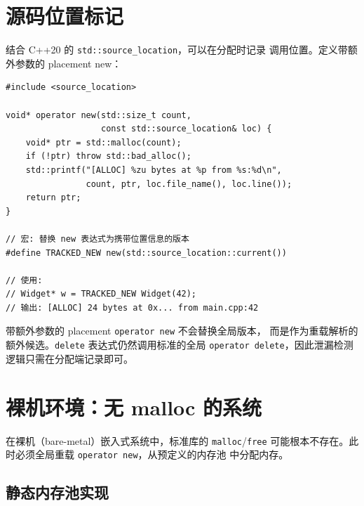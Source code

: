 \documentclass[12pt,a4paper,fontset=fandol]{ctexbook}
\newcommand{\cpp}[1]{C++#1}
\begin{document}
\section{源码位置标记}

结合 \cpp{20} 的 \texttt{std::source\_location}，可以在分配时记录
调用位置。定义带额外参数的 placement new：

\begin{lstlisting}
#include <source_location>

void* operator new(std::size_t count,
                   const std::source_location& loc) {
    void* ptr = std::malloc(count);
    if (!ptr) throw std::bad_alloc();
    std::printf("[ALLOC] %zu bytes at %p from %s:%d\n",
                count, ptr, loc.file_name(), loc.line());
    return ptr;
}

// 宏: 替换 new 表达式为携带位置信息的版本
#define TRACKED_NEW new(std::source_location::current())

// 使用:
// Widget* w = TRACKED_NEW Widget(42);
// 输出: [ALLOC] 24 bytes at 0x... from main.cpp:42
\end{lstlisting}

\begin{note}[title=Placement delete]
带额外参数的 placement \texttt{operator new} 不会替换全局版本，
而是作为重载解析的额外候选。\texttt{delete} 表达式仍然调用标准的全局
\texttt{operator delete}，因此泄漏检测逻辑只需在分配端记录即可。
\end{note}

\section{裸机环境：无 malloc 的系统}

在裸机（bare-metal）嵌入式系统中，标准库的 \texttt{malloc}/\allowbreak{}\texttt{free}
可能根本不存在。此时必须全局重载 \texttt{operator new}，从预定义的内存池
中分配内存。

\subsection{静态内存池实现}
\end{document}
